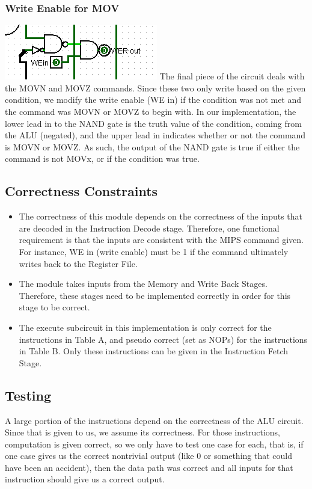 \documentclass{article}
\begin{document}
\subsubsection{Write Enable for MOV}
\includegraphics{MOV.png}
The final piece of the circuit deals with the MOVN and MOVZ commands. Since these two only write based on the given condition, we modify the write enable (WE in) if the condition was not met and the command was MOVN or MOVZ to begin with. In our implementation, the lower lead in to the NAND gate is the truth value of the condition, coming from the ALU (negated), and the upper lead in indicates whether or not the command is MOVN or MOVZ. As such, the output of the NAND gate is true if either the command is not MOVx, or if the condition was true. 

\subsection{Correctness Constraints}
\begin{itemize}
\item The correctness of this module depends on the correctness of the inputs that are decoded in the Instruction Decode stage. Therefore, one functional requirement is that the inputs are consistent with the MIPS command given. For instance, WE in (write enable) must be 1 if the command ultimately writes back to the Register File. 
\item The module takes inputs from the Memory and Write Back Stages. Therefore, these stages need to be implemented correctly in order for this stage to be correct.
\item The execute subcircuit in this implementation is only correct for the instructions in Table A, and pseudo correct (set as NOPs) for the instructions in Table B. Only these instructions can be given in the Instruction Fetch Stage.

\end{itemize}

\subsection{Testing}
A large portion of the instructions depend on the correctness of the ALU circuit. Since that is given to us, we assume its correctness. For those instructions, computation is given correct, so we only have to test one case for each, that is, if one case gives us the correct nontrivial output (like 0 or something that could have been an accident), then the data path was correct and all inputs for that instruction should give us a correct output. 
\end{document}
